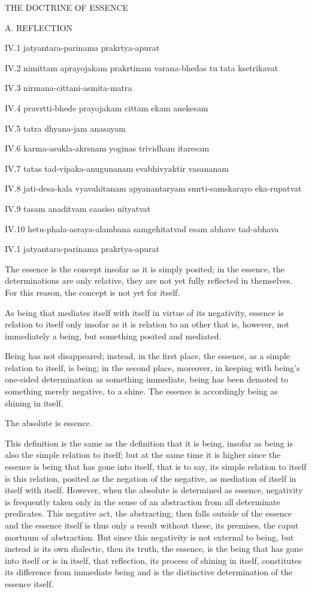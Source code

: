 THE DOCTRINE OF ESSENCE

A. REFLECTION

IV.1
jatyantara-parinama prakrtya-apurat

IV.2
nimittam aprayojakam prakrtinam varana-bhedas tu tata ksetrikavat

IV.3
nirmana-cittani-asmita-matra

IV.4
pravrtti-bhede prayojakam cittam ekam anekesam

IV.5
tatra dhyana-jam anasayam

IV.6
karma-asukla-akrsnam yoginas trividham itaresam

IV.7
tatas tad-vipaka-anugunanam evabhivyaktir vasananam

IV.8
jati-desa-kala vyavahitanam apyanantaryam smrti-samskarayo eka-rupatvat

IV.9
tasam anaditvam caasiso nityatvat

IV.10
hetu-phala-asraya-alambana samgehitatvad esam abhave tad-abhava


IV.1
jatyantara-parinama prakrtya-apurat

The essence is the concept insofar as it is simply posited;
in the essence, the determinations are only relative,
they are not yet fully reflected in themselves.
For this reason, the concept is not yet for itself.

As being that mediates itself with itself in virtue of its negativity,
essence is relation to itself only insofar as
it is relation to an other that is, however, not immediately a being,
but something posited and mediated.

Being has not disappeared;
instead, in the first place,
the essence, as a simple relation to itself, is being;
in the second place, moreover,
in keeping with being's one-sided determination as something immediate,
being has been demoted to something merely negative, to a shine.
The essence is accordingly being as shining in itself.

    The absolute is essence.

    This definition is the same as the definition that it is being,
    insofar as being is also the simple relation to itself;
    but at the same time it is higher since the essence is
    being that has gone into itself, that is to say,
    its simple relation to itself is this relation,
    posited as the negation of the negative,
    as mediation of itself in itself with itself.
    However, when the absolute is determined as essence,
    negativity is frequently taken only in the sense of
    an abstraction from all determinate predicates.
    This negative act, the abstracting, then falls outside of the essence and
    the essence itself is thus only a result without these, its premises,
    the caput mortuum of abstraction.
    But since this negativity is not external to being,
    but instead is its own dialectic,
    then its truth, the essence,
    is the being that has gone into itself or is in itself,
    that reflection, its process of shining in itself,
    constitutes its difference from immediate being and
    is the distinctive determination of the essence itself.

